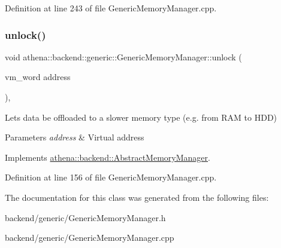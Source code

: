 Definition at line 243 of file Generic\+Memory\+Manager.\+cpp.

\mbox{\label{classathena_1_1backend_1_1generic_1_1_generic_memory_manager_a58a2b56a07a96c3cabb7b8fd079b3eae}} 
\subsubsection{\texorpdfstring{unlock()}{unlock()}}
{\footnotesize\ttfamily void athena\+::backend\+::generic\+::\+Generic\+Memory\+Manager\+::unlock (\begin{DoxyParamCaption}\item[{vm\+\_\+word}]{address }\end{DoxyParamCaption})\hspace{0.3cm}{\ttfamily [override]}, {\ttfamily [virtual]}}

Lets data be offloaded to a slower memory type (e.\+g. from R\+AM to H\+DD) 
\begin{DoxyParams}{Parameters}
{\em address} & Virtual address \\
\hline
\end{DoxyParams}


Implements \mbox{\hyperlink{classathena_1_1backend_1_1_abstract_memory_manager_aec859ee3bf6011d8710b2ec4bfc2373e}{athena\+::backend\+::\+Abstract\+Memory\+Manager}}.



Definition at line 156 of file Generic\+Memory\+Manager.\+cpp.



The documentation for this class was generated from the following files\+:\begin{DoxyCompactItemize}
\item 
backend/generic/Generic\+Memory\+Manager.\+h\item 
backend/generic/Generic\+Memory\+Manager.\+cpp\end{DoxyCompactItemize}
